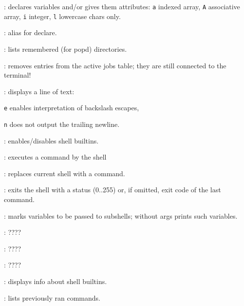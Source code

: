 \begin{compactenum}
\item [\symbolbash] : declares variables and/or gives them attributes: \texttt{a} indexed array, \texttt{A} associative array, \texttt{i} integer, \texttt{l} lowercase chars only.
\item [\symbolbash] : alias for declare.

\item [\symbolbash] : lists remembered (for popd) directories.

\item [\symbolbash] : removes entries from the active jobs table; they are still connected to the terminal!

\item [\symbolbash] : displays a line of text:
\item [\texttt{e}] enables interpretation of backslash escapes,
\item [\texttt{n}] does not output the trailing newline.

\item [\symbolbash] : enables/disables shell builtins.

\item [\symbolbash] : executes a command by the shell

\item [\symbolbash] : replaces current shell with a command.

\item [\symbolbash] : exits the shell with a status (0..255) or, if omitted, exit code of the last command.

\item [\symbolbash] : marks variables to be passed to subshells; without args prints such variables.

\item [\symbolbash] : \dotfill ????

\item [\symbolbash] : \dotfill ????

\item [\symbolbash] : \dotfill ????

\item [\symbolbash] : displays info about shell builtins.

\item [\symbolbash] : lists previously ran commands.


\end{compactenum}
